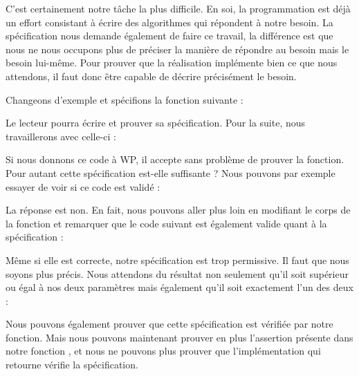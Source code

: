

C'est certainement notre tâche la plus difficile. En soi, la programmation est
déjà un effort consistant à écrire des algorithmes qui répondent à notre
besoin. La spécification nous demande également de faire ce travail, la
différence est que nous ne nous occupons plus de préciser la manière de répondre
au besoin mais le besoin lui-même. Pour prouver que la réalisation implémente
bien ce que nous attendons, il faut donc être capable de décrire précisément le
besoin.



Changeons d'exemple et spécifions la fonction suivante :






Le lecteur pourra écrire et prouver sa spécification. Pour la suite, nous
travaillerons avec celle-ci :






Si nous donnons ce code à WP, il accepte sans problème de prouver la fonction.
Pour autant cette spécification est-elle suffisante ? Nous pouvons par exemple
essayer de voir si ce code est validé :






La réponse est non. En fait, nous pouvons aller plus loin en modifiant le corps
de la fonction  et remarquer que le code suivant est également valide
quant à la spécification :







Même si elle est correcte, notre spécification est trop permissive. Il faut que nous
soyons plus précis.
Nous attendons du résultat non seulement qu'il soit supérieur ou égal à nos
deux paramètres mais également qu'il soit exactement l'un des deux :





Nous pouvons également prouver que cette spécification est vérifiée par notre
fonction. Mais nous pouvons maintenant prouver en plus l'assertion présente dans
notre fonction , et nous ne pouvons plus prouver que
l'implémentation qui retourne  vérifie la spécification.


